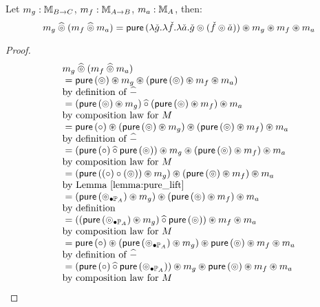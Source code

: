 \begin{lemmaa}{15}\label{lemma:pappl_comp_appl}
Let $m_g:\mstream{B\rightarrow C}$, $m_f:\mstream{A\rightarrow B}$, $m_a:\mstream{A}$, then:
$$
m_g \alift{\pappl} (m_f \alift{\pappl} m_a)
 = \apure\, (\lambda \pstr{g}. \lambda \pstr{f}. \lambda \pstr{a}. \pstr{g} \pappl (\pstr{f}\pappl \pstr{a})) \appl m_g \appl m_f \appl m_a
$$
\end{lemmaa}
\begin{proof}
$$
\begin{array}{ll}
m_g \alift{\pappl} (m_f \alift{\pappl} m_a) \\
{}= \apure\, (\pappl) \appl m_g \appl (\apure\, (\pappl) \appl m_f \appl m_a) \\
 \mbox{by definition of }\alift{-}\\
{}= (\apure\, (\pappl) \appl m_g) \alift{\comp} (\apure\, (\pappl) \appl m_f)  \appl m_a \\
 \mbox{by composition law for }M \\
{}=   \apure\, (\comp) \appl  (\apure\, (\pappl) \appl m_g) \appl (\apure\, (\pappl) \appl m_f) \appl m_a \\
 \mbox{by definition of }\alift{-}\\
{}=   (\apure\, (\comp) \alift{\comp}  \apure\, (\pappl)) \appl m_g \appl (\apure\, (\pappl) \appl m_f) \appl m_a \\
 \mbox{by composition law for }M \\
{}=   ( \apure\, ((\comp) \comp (\pappl)) \appl m_g ) \appl (\apure\, (\pappl) \appl m_f)   \appl m_a\\
 \mbox{by Lemma \ref{lemma:pure_lift}}\\
{}=   ( \apure\, (\clift{\pappl}{\pstream{A}}) \appl m_g ) \appl (\apure\, (\pappl) \appl m_f)   \appl m_a\\
 \mbox{by definition}\\
{}=   ( ( \apure\, (\clift{\pappl}{\pstream{A}})  \appl m_g ) \alift{\comp} \apure\, (\pappl)) \appl m_f  \appl m_a\\
 \mbox{by composition law for }M \\
{}=  \apure\, (\comp) \appl (\apure\, (\clift{\pappl}{\pstream{A}})  \appl m_g ) \appl \apure\, (\pappl)  \appl m_f  \appl m_a\\
 \mbox{by definition of }\alift{-} \\
{}=   (\apure\, (\comp) \alift{\comp}  \apure\, (\clift{\pappl}{\pstream{A}}) ) \appl m_g \appl \apure\, (\pappl) \appl m_f \appl m_a\\
 \mbox{by composition law for }M \\

\end{array}$$
\end{proof}
